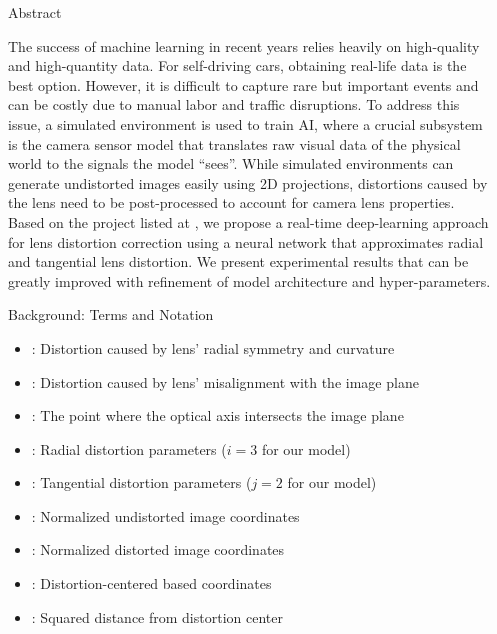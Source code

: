 \documentclass[final]{beamer}
\newlength{\sepwidth}
\newlength{\colwidth}
\newcommand{\separatorcolumn}{\begin{column}{\sepwidth}\end{column}}
\begin{document}
\begin{frame}[t]
  \begin{columns}[t]
    \separatorcolumn

    \begin{column}{\colwidth}

      \begin{block}{Abstract}

        The success of machine learning in recent years relies heavily on high-quality and high-quantity data. For self-driving cars, obtaining real-life data is the best option. However, it is difficult to capture rare but important events and can be costly due to manual labor and traffic disruptions. To address this issue, a simulated environment is used to train AI, where a crucial subsystem is the camera sensor model that translates raw visual data of the physical world to the signals the model “sees”. While simulated environments can generate undistorted images easily using 2D projections, distortions caused by the lens need to be post-processed to account for camera lens properties. Based on the project listed at \cite{mathworks_innovation}, we propose a real-time deep-learning approach for lens distortion correction using a neural network that approximates radial and tangential lens distortion. We present experimental results that can be greatly improved with refinement of model architecture and hyper-parameters.

      \end{block}

      \begin{block}{Background: Terms and Notation}
        \begin{itemize}
          \item {}: Distortion caused by lens' radial symmetry and curvature
          \item {}: Distortion caused by lens' misalignment with the image plane
          \item {}: The point where the optical axis intersects the image plane
          \item {}: Radial distortion parameters ($i = 3$ for our model)
          \item {}: Tangential distortion parameters ($j = 2$ for our model)
          \item {}: Normalized undistorted image coordinates
          \item {}: Normalized distorted image coordinates
          \item \makebox[10cm][l]{$\bar{\cdot}\quad$}: Distortion-centered based coordinates
          \item {}: Squared distance from distortion center
        \end{itemize}
      \end{block}


\end{column}
\end{columns}
\end{frame}
\end{document}

